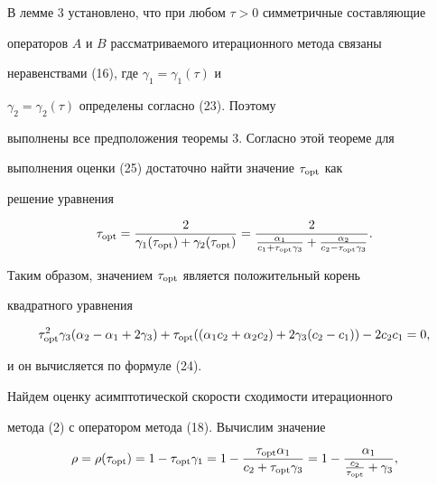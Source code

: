 \begin{pf} 


В лемме 3 установлено, что при любом $\tau>0$ симметричные составляющие 


операторов $A$ и $B$ рассматриваемого итерационного метода связаны 


неравенствами (16), где $\gamma_1=\gamma_1(\tau)$ и 


$\gamma_2=\gamma_2(\tau)$ определены согласно (23). Поэтому 


выполнены все предположения теоремы 3. Согласно этой теореме для 


выполнения оценки (25) достаточно найти значение $\tau_{\operatorname{opt}}$ как 


решение уравнения 


$$ 


\tau_{\opt}=\frac{2}{\gamma_1(\tau_{\opt})+ 


\gamma_2(\tau_{\opt})}=\frac{2} 


{\frac{\alpha_1}{c_1+\tau_{\opt}\gamma_3}+ 


\frac{\alpha_2}{c_2-\tau_{\opt}\gamma_3}}. 


$$ 


 


Таким образом, значением $\tau_{\operatorname{opt}}$ является положительный корень 


квадратного уравнения


$$ 


\tau^2_{\opt}\gamma_3(\alpha_2-\alpha_1+2\gamma_3)+ 


\tau_{\opt}((\alpha_1c_2+\alpha_2c_2)+2\gamma_3(c_2-c_1))- 


2c_2c_1=0, 


$$ 


и он вычисляется по формуле (24). 


 


Найдем оценку асимптотической скорости сходимости итерационного 


метода (2) с оператором метода (18). Вычислим значение 


\begin{gather*} 


\rho=\rho(\tau_{\opt})=1-\tau_{\opt}\gamma_1=1- 


\frac{\tau_{\opt}\alpha_1}{c_2+\tau_{\opt}\gamma_3}= 


1-\frac{\alpha_1}{\frac{c_2}{\tau_{\opt}}+\gamma_3},\\ 



\end{gather*}
\end{pf}
